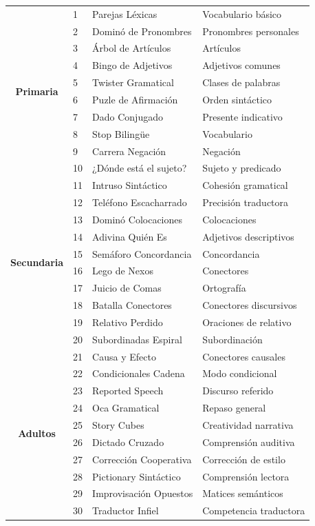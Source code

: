\documentclass[12pt,a4paper]{article}
\begin{document}
\begin{longtable}{|c|l|l|p{5cm}|}
\multirow{10}{*}{\textbf{Primaria}} & 1 & Parejas Léxicas & Vocabulario básico \\
 & 2 & Dominó de Pronombres & Pronombres personales \\
 & 3 & Árbol de Artículos & Artículos \\
 & 4 & Bingo de Adjetivos & Adjetivos comunes \\
 & 5 & Twister Gramatical & Clases de palabras \\
 & 6 & Puzle de Afirmación & Orden sintáctico \\
 & 7 & Dado Conjugado & Presente indicativo \\
 & 8 & Stop Bilingüe & Vocabulario \\
 & 9 & Carrera Negación & Negación \\
 & 10 & ¿Dónde está el sujeto? & Sujeto y predicado \\
\hline
\multirow{10}{*}{\textbf{Secundaria}} & 11 & Intruso Sintáctico & Cohesión gramatical \\
 & 12 & Teléfono Escacharrado & Precisión traductora \\
 & 13 & Dominó Colocaciones & Colocaciones \\
 & 14 & Adivina Quién Es & Adjetivos descriptivos \\
 & 15 & Semáforo Concordancia & Concordancia \\
 & 16 & Lego de Nexos & Conectores \\
 & 17 & Juicio de Comas & Ortografía \\
 & 18 & Batalla Conectores & Conectores discursivos \\
 & 19 & Relativo Perdido & Oraciones de relativo \\
 & 20 & Subordinadas Espiral & Subordinación \\
\hline
\multirow{10}{*}{\textbf{Adultos}} & 21 & Causa y Efecto & Conectores causales \\
 & 22 & Condicionales Cadena & Modo condicional \\
 & 23 & Reported Speech & Discurso referido \\
 & 24 & Oca Gramatical & Repaso general \\
 & 25 & Story Cubes & Creatividad narrativa \\
 & 26 & Dictado Cruzado & Comprensión auditiva \\
 & 27 & Corrección Cooperativa & Corrección de estilo \\
 & 28 & Pictionary Sintáctico & Comprensión lectora \\
 & 29 & Improvisación Opuestos & Matices semánticos \\
 & 30 & Traductor Infiel & Competencia traductora \\
\hline
\end{longtable}
\end{document}
